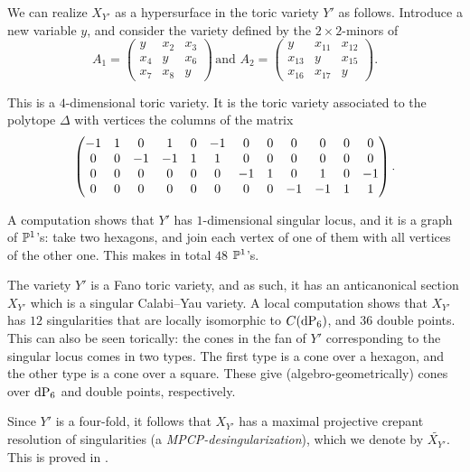 We can realize $X_{Y'}$ as a hypersurface in the toric variety $Y'$ as follows. Introduce a new variable $y$, and consider the variety defined by the $2 \times 2$-minors of
\[
A_1 = \begin{pmatrix}
y   & x_2 & x_3 \\
x_4 & y  & x_6 \\
x_7 & x_8 & y
\end{pmatrix}\,
\text{and }
A_2 = \begin{pmatrix}
y & x_{11} & x_{12} \\
x_{13} & y & x_{15} \\
x_{16} & x_{17} & y
\end{pmatrix}.
\]

This is a $4$-dimensional toric variety. It is the toric variety associated to the polytope $\Delta$ with vertices the columns of the matrix
\[
 \makeatletter\c@MaxMatrixCols=12\makeatother\begin{pmatrix}{-1}&      1&      0&      1&      0&      {-1}&      0&      0&      0&      0&      0&      0\\      0&      0&      {-1}&      {-1}&      1&      1&      0&      0&      0&      0&      0&      0\\      0&      0&      0&      0&      0&      0&      {-1}&      1&      0&      1&      0&      {-1}\\      0&      0&      0&      0&      0&      0&      0&      0&      {-1}&      {-1}&      1&      1\\      \end{pmatrix}.
\]

A computation shows that $Y'$ has $1$-dimensional singular locus, and it is a graph of $\P^1$'s: take two hexagons, and join each vertex of one of them with all vertices of the other one. This makes in total $48$ $\P^1$'s.

The variety $Y'$ is a Fano toric variety, and as such, it has an anticanonical section $X_{Y'}$ which is a singular Calabi--Yau variety. A local computation shows that $X_{Y'}$ has $12$ singularities that are locally isomorphic to $C(\dP6)$, and $36$ double points. This can also be seen torically: the cones in the fan of $Y'$ corresponding to the singular locus comes in two types. The first type is a cone over a hexagon, and the other type is a cone over a square. These give (algebro-geometrically) cones over $\dP6$ and double points, respectively.

Since $Y'$ is a four-fold, it follows that $X_{Y'}$ has a maximal projective crepant resolution of singularities (a \emph{MPCP-desingularization}), which we denote by $\widetilde{X_{Y'}}$. This is proved in \cite{mirrorsymmetry}.

